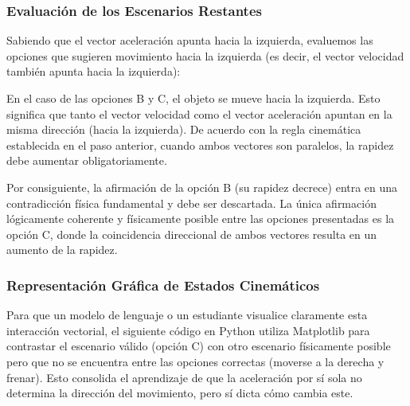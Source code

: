 \documentclass[12pt, a4paper]{article}
\begin{document}
\subsubsection*{Evaluación de los Escenarios Restantes}

Sabiendo que el vector aceleración apunta hacia la izquierda, evaluemos las opciones que sugieren movimiento hacia la izquierda (es decir, el vector velocidad también apunta hacia la izquierda):

En el caso de las opciones B y C, el objeto se mueve hacia la izquierda. Esto significa que tanto el vector velocidad como el vector aceleración apuntan en la misma dirección (hacia la izquierda). De acuerdo con la regla cinemática establecida en el paso anterior, cuando ambos vectores son paralelos, la rapidez debe aumentar obligatoriamente. 

Por consiguiente, la afirmación de la opción B (su rapidez decrece) entra en una contradicción física fundamental y debe ser descartada. La única afirmación lógicamente coherente y físicamente posible entre las opciones presentadas es la opción C, donde la coincidencia direccional de ambos vectores resulta en un aumento de la rapidez.

\subsubsection*{Representación Gráfica de Estados Cinemáticos}

Para que un modelo de lenguaje o un estudiante visualice claramente esta interacción vectorial, el siguiente código en Python utiliza Matplotlib para contrastar el escenario válido (opción C) con otro escenario físicamente posible pero que no se encuentra entre las opciones correctas (moverse a la derecha y frenar). Esto consolida el aprendizaje de que la aceleración por sí sola no determina la dirección del movimiento, pero sí dicta cómo cambia este.
\end{document}
